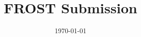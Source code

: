 \documentclass{llncs}
\title{FROST Submission}
\date{\today}
\author{}
\institute{}
\begin{document}
\let\oldaddcontentsline\addcontentsline
\def\addcontentsline#1#2#3{}

	\maketitle


	\begin{abstract}

  \end{abstract}

  \def\addcontentsline#1#2#3{\oldaddcontentsline{#1}{#2}{#3}}
	\onehalfspacing
  \setcounter{tocdepth}{3}
	\tableofcontents
	\singlespacing
	\newpage


%	
	
	
	

	\printbibliography


\end{document}
